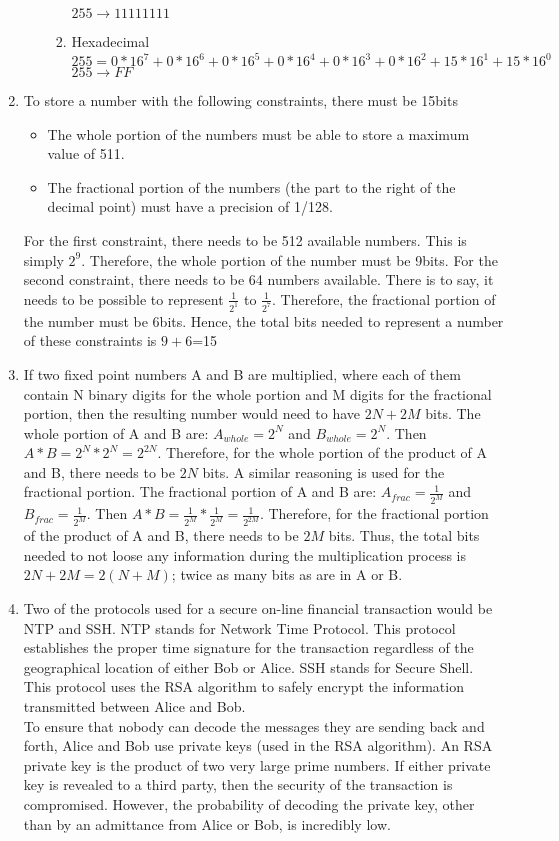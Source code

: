 \documentclass{article}
\begin{document}
\begin{enumerate}
\begin{enumerate}
\begin{enumerate}
$255 \rightarrow 11111111$
\item Hexadecimal\\
$255 = 0*16^{7} + 0*16^{6} + 0*16^{5} + 0*16^{4} + 0*16^{3} + 0*16^{2} + 15*16^{1} + 15*16^{0}$\\
$255 \rightarrow FF$
\end{enumerate}
\end{enumerate}
\item To store a number with the following constraints, there must be 15bits
\begin{itemize}
\item The whole portion of the numbers must be able to store a maximum value of 511.
\item The fractional portion of the numbers (the part to the right of the decimal point) must have a precision of 1/128. 
\end{itemize}
For the first constraint, there needs to be 512 available numbers.  This is simply $2^9$. Therefore, the whole portion of the number must be 9bits.  For the second constraint, there needs to be 64 numbers available.  There is to say, it needs to be possible to represent $\frac{1}{2^{1}}$ to $\frac{1}{2^{7}}$.  Therefore, the fractional portion of the number must be 6bits.  Hence, the total bits needed to represent a number of these constraints is $9+6$=15
\item If two fixed point numbers A and B are multiplied, where each of them contain N binary digits for the whole portion and M digits for the fractional portion, then the resulting number would need to have $2N + 2M$ bits.  The whole portion of A and B are: $A_{whole} = 2^{N}$ and $B_{whole} = 2^{N}$.  Then $A*B = 2^{N}*2^{N} = 2^{2N}$.  Therefore, for the whole portion of the product of A and B, there needs to be $2N$ bits.  A similar reasoning is used for the fractional portion.  The fractional portion of A and B are: $A_{frac} = \frac{1}{2^{M}}$ and $B_{frac} = \frac{1}{2^{M}}$.  Then $A*B = \frac{1}{2^{M}}*\frac{1}{2^{M}} = \frac{1}{2^{2M}}$.  Therefore, for the fractional portion of the product of A and B, there needs to be $2M$ bits.  Thus, the total bits needed to not loose any information during the multiplication process is $2N+2M = 2(N+M)$; twice as many bits as are in A or B.
\item Two of the protocols used for a secure on-line  financial transaction would be NTP and SSH.  NTP stands for Network Time Protocol.  This protocol establishes the proper time signature for the transaction regardless of the geographical location of either Bob or Alice. SSH stands for Secure Shell.  This protocol uses the RSA algorithm to safely encrypt the information transmitted between Alice and Bob. \\
To ensure that nobody can decode the messages they are sending back and forth, Alice and Bob use private keys (used in the RSA algorithm).  An RSA private key is the product of two very large prime numbers.  If either private key is revealed to a third party, then the security of the transaction is compromised.  However, the probability of decoding the private key, other than by an admittance from Alice or Bob, is incredibly low.     
\end{enumerate}
\end{document}

